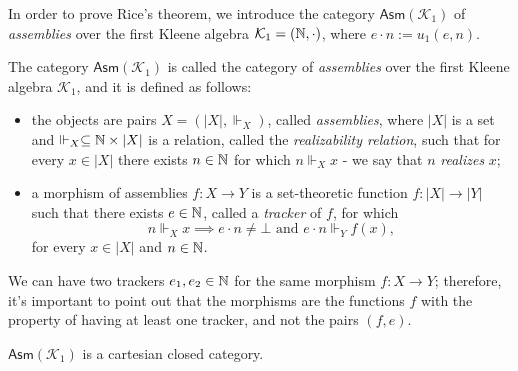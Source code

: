 In order to prove Rice's theorem, we introduce the category $\mathsf{Asm}(\mathcal K_1)$ of \emph{assemblies} over the first Kleene algebra $\mathcal K_1 = (\mathbb{N},\cdot)$, where $e \cdot n := u_1(e,n)$.\label{idx:kleene-algebra}

\begin{definition}\label{idx:assemblies}
    The category $\mathsf{Asm}(\mathcal K_1)$ is called the category of \emph{assemblies} over the first Kleene algebra $\mathcal K_1$, and it is defined as follows:
    \begin{itemize}
        \item the objects are pairs $X = (|X|,\Vdash_X)$, called \emph{assemblies}, where $|X|$ is a set and $\Vdash_X \subseteq \mathbb{N} \times |X|$ is a relation, called the \emph{realizability relation}, such that for every $x \in |X|$ there exists $n \in \mathbb{N}$ for which $n \Vdash_X x$ - we say that $n$ \emph{realizes} $x$;\label{idx:realizability}
        \item a morphism of assemblies $f : X \to Y$ is a set-theoretic function $f : |X| \to |Y|$ such that there exists $e \in \mathbb{N}$, called a \emph{tracker} of $f$, for which
        \[ n \Vdash_X x \implies e \cdot n \ne \bot \text{ and } e \cdot n \Vdash_Y f(x), \]
        for every $x \in |X|$ and $n \in \mathbb{N}$.
    \end{itemize}
\end{definition}

\begin{remark}
    We can have two trackers $e_1,e_2 \in \mathbb{N}$ for the same morphism $f : X \to Y$; therefore, it's important to point out that the morphisms are the functions $f$ with the property of having at least one tracker, and not the pairs $(f,e)$.
\end{remark}

\begin{proposition}
    $\mathsf{Asm}(\mathcal K_1)$ is a cartesian closed category.
\end{proposition}

